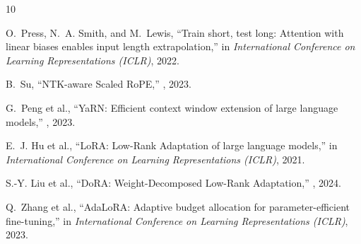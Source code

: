 \documentclass[11pt,journal,compsoc]{IEEEtran}
\begin{document}
\begin{thebibliography}{10}

O.~Press, N.~A. Smith, and M.~Lewis,
\newblock ``Train short, test long: Attention with linear biases enables input length extrapolation,''
\newblock in {\em International Conference on Learning Representations (ICLR)}, 2022.

B.~Su,
\newblock ``NTK-aware Scaled RoPE,''
, 2023.

G.~Peng et al.,
\newblock ``YaRN: Efficient context window extension of large language models,''
, 2023.

E.~J. Hu et al.,
\newblock ``LoRA: Low-Rank Adaptation of large language models,''
\newblock in {\em International Conference on Learning Representations (ICLR)}, 2021.

S.-Y. Liu et al.,
\newblock ``DoRA: Weight-Decomposed Low-Rank Adaptation,''
, 2024.

Q.~Zhang et al.,
\newblock ``AdaLoRA: Adaptive budget allocation for parameter-efficient fine-tuning,''
\newblock in {\em International Conference on Learning Representations (ICLR)}, 2023.

\end{thebibliography}
\end{document}
